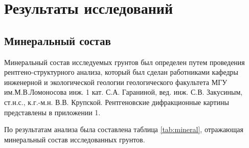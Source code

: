 \chapter{Результаты исследований}\label{ch:ch7}

\section{Минеральный состав}

Минеральный состав исследуемых грунтов был определен путем проведения рентгено-структурного 
анализа, который был сделан работниками кафедры  инженерной и экологической геологии 
геологического факультета МГУ им.М.В.Ломоносова
инж. 1 кат. С.А. Гараниной, вед. инж. С.В. Закусиным, ст.н.с., к.г.-м.н. В.В. Крупской.
Рентгеновские дифракционные картины представлены в приложении 1.

По результатам анализа была составлена таблица \ref{tab:mineral}, отражающая минеральный состав 
исследованных грунтов.

